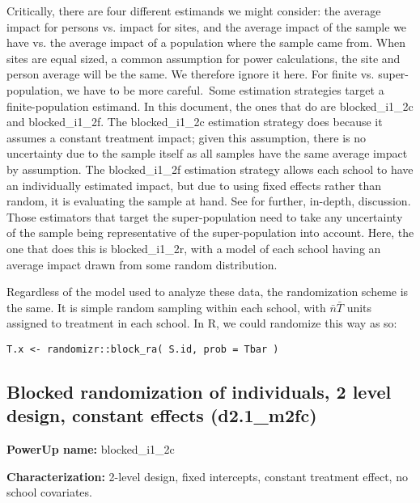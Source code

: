 \documentclass[12pt]{article}
\begin{document}
Critically, there are four different estimands we might consider: the average impact for persons vs. impact for sites, and the average impact of the sample we have vs. the average impact of a population where the sample came from.
When sites are equal sized, a common assumption for power calculations, the site and person average will be the same.
We therefore ignore it here.
For finite vs. super-population, we have to be more careful.\
Some estimation strategies target a finite-population estimand.
In this document, the ones that do are blocked\_i1\_2c and blocked\_i1\_2f.
The blocked\_i1\_2c estimation strategy does because it assumes a constant treatment impact; given this assumption, there is no uncertainty due to the sample itself as all samples have the same average impact by assumption.
The blocked\_i1\_2f estimation strategy allows each school to have an individually estimated impact, but due to using fixed effects rather than random, it is evaluating the sample at hand.
See \citet{Miratrix2020} for further, in-depth, discussion.
Those estimators that target the super-population need to take any uncertainty of the sample being representative of the super-population into account.
Here, the one that does this is blocked\_i1\_2r, with a model of each school having an average impact drawn from some random distribution.


Regardless of the model used to analyze these data, the randomization scheme is the same.
It is simple random sampling within each school, with $\bar{n}\bar{T}$ units assigned to treatment in each school.
In R, we could randomize this way as so:
\begin{verbatim}
T.x <- randomizr::block_ra( S.id, prob = Tbar )
\end{verbatim}



\subsection{Blocked randomization of individuals, 2 level design, constant effects (d2.1\_m2fc)}

\textbf{PowerUp name:} blocked\_i1\_2c

\textbf{Characterization:} 2-level design, fixed intercepts, constant treatment effect, no school covariates.
\end{document}

